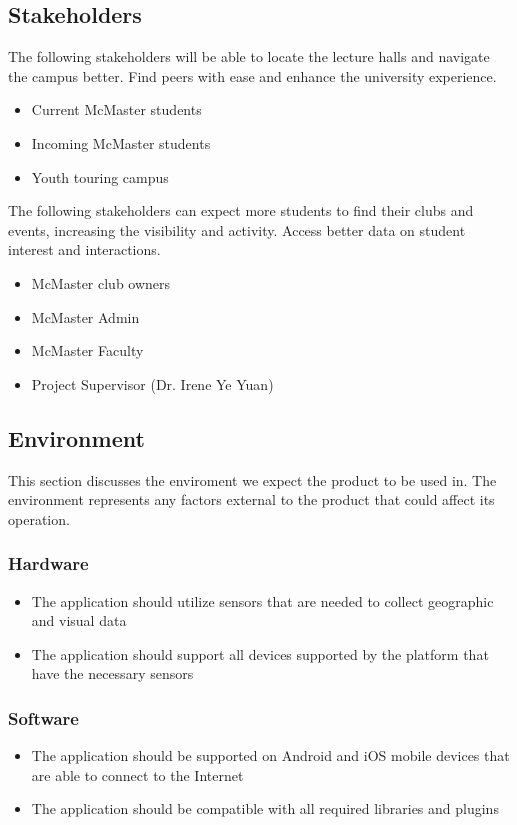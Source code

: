 \documentclass{article}
\begin{document}
\subsection{Stakeholders}

\quad The following stakeholders will be able to locate the lecture halls and navigate the campus better. Find peers with ease and enhance the university experience.

\begin{itemize}
    \item Current McMaster students
    \item Incoming McMaster students    
    \item Youth touring campus
\end{itemize}
    \quad The following stakeholders can expect more students to find their clubs and events, increasing the visibility and activity. Access better data on student interest and interactions. 
\begin{itemize}
    \item McMaster club owners
    \item McMaster Admin
    \item McMaster Faculty
    \item Project Supervisor (Dr. Irene Ye Yuan)
\end{itemize}

\subsection{Environment}

This section discusses the enviroment we expect the product to be used in. The environment represents any factors external to the product that could affect its operation.

\subsubsection{Hardware}
\begin{itemize}
    \item The application should utilize sensors that are needed to collect geographic and visual data
    \item The application should support all devices supported by the platform that have the necessary sensors
\end{itemize}

\subsubsection{Software}
\begin{itemize}
    \item The application should be supported on Android and iOS mobile devices that are able to connect to the Internet
    \item The application should be compatible with all required libraries and plugins
\end{itemize}
\end{document}
